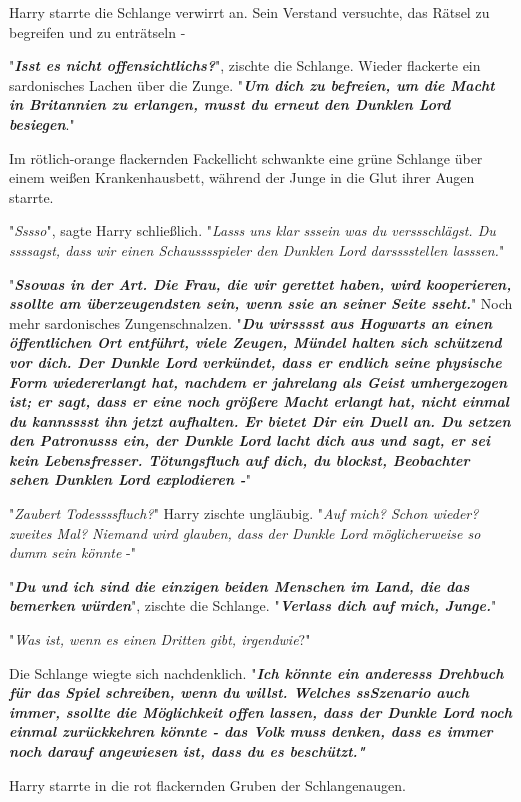 {Harry starrte die Schlange verwirrt an. Sein Verstand versuchte, das Rätsel zu begreifen und zu enträtseln -

"\textbf{\emph{Isst es nicht offensichtlichs?}}", zischte die Schlange. Wieder flackerte ein sardonisches Lachen über die Zunge. "\textbf{\emph{Um dich zu befreien, um die Macht in Britannien zu erlangen, musst du erneut den Dunklen Lord besiegen}}."

Im rötlich-orange flackernden Fackellicht schwankte eine grüne Schlange über einem weißen Krankenhausbett, während der Junge in die Glut ihrer Augen starrte.

"\emph{Sssso}", sagte Harry schließlich. "\emph{Lasss uns klar sssein was du verssschlägst. Du ssssagst, dass wir einen Schausssspieler den Dunklen Lord darsssstellen lasssen.}"

"\textbf{\emph{Ssowas in der Art. Die Frau, die wir gerettet haben, wird kooperieren, ssollte am überzeugendsten sein, wenn ssie an seiner Seite sseht.}}" Noch mehr sardonisches Zungenschnalzen. "\textbf{\emph{Du wirsssst aus Hogwarts an einen öffentlichen Ort entführt, viele Zeugen, Mündel halten sich schützend vor dich. Der Dunkle Lord verkündet, dass er endlich seine physische Form wiedererlangt hat, nachdem er jahrelang als Geist umhergezogen ist; er sagt, dass er eine noch größere Macht erlangt hat, nicht einmal du kannsssst ihn jetzt aufhalten. Er bietet Dir ein Duell an. Du setzen den Patronusss ein, der Dunkle Lord lacht dich aus und sagt, er sei kein Lebensfresser. Tötungsfluch auf dich, du blockst, Beobachter sehen Dunklen Lord explodieren -}}"

"\emph{Zaubert Todessssfluch?}" Harry zischte ungläubig. "\emph{Auf mich? Schon wieder? zweites Mal? Niemand wird glauben, dass der Dunkle Lord möglicherweise so dumm sein könnte} -"

"\textbf{\emph{Du und ich sind die einzigen beiden Menschen im Land, die das bemerken würden}}", zischte die Schlange. "\textbf{\emph{Verlass dich auf mich, Junge.}}"

"\emph{Was ist, wenn es einen Dritten gibt, irgendwie}?"

Die Schlange wiegte sich nachdenklich. "\textbf{\emph{Ich könnte ein anderesss Drehbuch für das Spiel schreiben, wenn du willst. Welches ssSzenario auch immer, ssollte die Möglichkeit offen lassen, dass der Dunkle Lord noch einmal zurückkehren könnte - das Volk muss denken, dass es immer noch darauf angewiesen ist, dass du es beschützt."}}

Harry starrte in die rot flackernden Gruben der Schlangenaugen.

}

